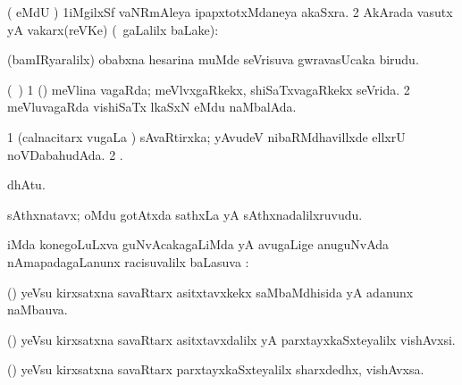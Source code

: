 \bentry
{}
\gl{\nA}
\bmng
( eMdU \parx) 
\bnum
\num{1}iMgilxSf vaNRmAleya ipapxtotxMdaneya akaSxra. 
\num{2}  AkArada vasutx yA vakarx(reVKe) (\kanmu\ \saMpa gaLalilx baLake):  
\enum
\emng
\eentry

\bentry
{} 
\gl{\nA}
\expl{}
\bmng
(bamIRyaralilx) obabxna hesarina muMde seVrisuva gwravasUcaka birudu. 
\emng
\eentry

\bentry
{} 
\gl{\gu}
\expl{}
\bmng
(\kanmu\ \birx) 
\bnum
\num{1} (\AmA) meVlina vagaRda; meVlvxgaRkekx, shiSaTxvagaRkekx seVrida. 
\num{2} meVluvagaRda vishiSaTx lkaSxN eMdu naMbalAda. 
\enum
\emng
\eentry

\bentry
{} 
\gl{\saMkiSx}
\expl{}
\bmng
\bnum
\num{1} (calnacitarx \mo vugaLa \vi)  sAvaRtirxka; yAvudeV nibaRMdhavillxde ellxrU noVDabahudAda. 
\num{2} . 
\enum
\emng
\eentry

\bentry
{} 
\gl{\saMkeV}
\expl{(\ravi) }
\bmng
{} dhAtu. 
\emng
\eentry

\bentry
{}
\gl{\pUparx}
\expl{}
\bmng
{} 
\emng
\eentry

\bentry
{}
\gl{\saMkiSx}
\expl{}
\bmng
{} 
\emng
\eentry

\bentry
{} 
\gl{\nA}
\expl{}
\bmng
sAthxnatavx; oMdu gotAtxda sathxLa yA sAthxnadalilxruvudu. 
\emng
\eentry

\bentry
{}
\gl{\uparx}
\expl{}
\bmng
{} iMda konegoLuLxva guNvAcakagaLiMda yA avugaLige anuguNvAda nAmapadagaLanunx racisuvalilx baLasuva \uparx:  
\emng
\eentry

\bentry
{} 
\gl{\gu}
\expl{}
\bmng
(\deVva) yeVsu kirxsatxna savaRtarx asitxtavxkekx saMbaMdhisida yA adanunx naMbauva. 
\emng
\eentry

\bentry
{} 
\gl{\nA}
\expl{}
\bmng
(\deVva) yeVsu kirxsatxna savaRtarx asitxtavxdalilx yA parxtayxkaSxteyalilx vishAvxsi. 
\emng
\eentry

\bentry
{} 
\gl{\nA}
\expl{}
\bmng
(\deVva) yeVsu kirxsatxna savaRtarx parxtayxkaSxteyalilx sharxdedhx, vishAvxsa. 
\emng
\eentry

